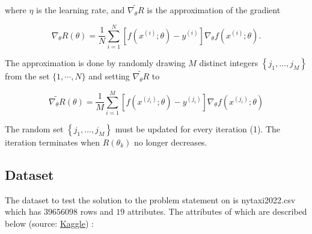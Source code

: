 \documentclass{article}
\begin{document}
where $\eta$ is the learning rate, and $\widetilde{\nabla_{\theta} R}$ is the approximation of the gradient

$$
\nabla_{\theta} R(\theta)=\frac{1}{N} \sum_{i=1}^{N}\left[f\left(x^{(i)} ; \theta\right)-y^{(i)}\right] \nabla_{\theta} f\left(x^{(i)} ; \theta\right) .
$$

The approximation is done by randomly drawing $M$ distinct integers $\left\{j_{1}, \ldots, j_{M}\right\}$ from the set $\{1, \cdots, N\}$ and setting $\widetilde{\nabla_{\theta} R}$ to

$$
\widetilde{\nabla_{\theta} R}(\theta)=\frac{1}{M} \sum_{i=1}^{M}\left[f\left(x^{\left(j_{i}\right)} ; \theta\right)-y^{\left(j_{i}\right)}\right] \nabla_{\theta} f\left(x^{\left(j_{i}\right)} ; \theta\right)
$$

The random set $\left\{j_{1}, \ldots, j_{M}\right\}$ must be updated for every iteration (1). The iteration terminates when $R\left(\theta_{k}\right)$ no longer decreases.

\subsection{Dataset}
The dataset to test the solution to the problem statement on is nytaxi2022.csv which has $39656098$ rows and $19$ attributes. The attributes of which are described below (source: \href{https://www.kaggle.com/datasets/diishasiing/revenue-for-cab-drivers}{Kaggle}) :
\end{document}

